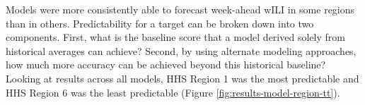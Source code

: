 \documentclass[9pt,twocolumn,twoside]{pnas-new}\usepackage[]{graphicx}\usepackage[]{color}
\begin{document}




Models were more consistently able to forecast week-ahead wILI in some regions than in others.
Predictability for a target can be broken down into two components. 
First, what is the baseline score that a model derived solely from historical averages can achieve? 
Second, by using alternate modeling approaches, how much more accuracy can be achieved beyond this historical baseline? 
Looking at results across all models,
HHS Region 1 was the most predictable and HHS Region 6 was the least predictable (Figure \ref{fig:results-model-region-tt}).
\end{document}
